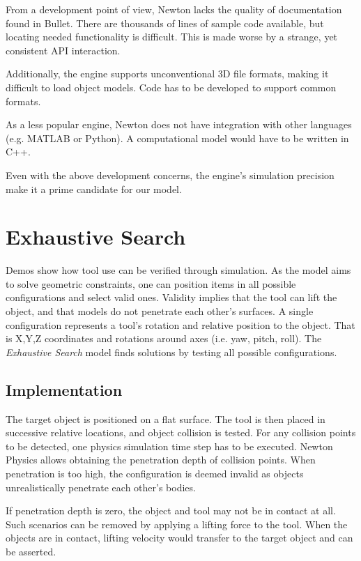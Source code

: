 \documentclass[11]{article}
\begin{document}
From a development point of view, Newton lacks the quality of documentation found in Bullet. 
There are thousands of lines of sample code available, but locating needed functionality is difficult. 
This is made worse by a strange, yet consistent API interaction.

Additionally, the engine supports unconventional 3D file formats, making it difficult to load object models.
Code has to be developed to support common formats.

As a less popular engine, Newton does not have integration with other languages (e.g. MATLAB or Python). 
A computational model would have to be written in C++.

Even with the above development concerns, the engine's simulation precision make it a prime candidate for our model.  

\section{Exhaustive Search}
Demos show how tool use can be verified through simulation.
As the model aims to solve geometric constraints, one can position items in all possible configurations and select valid ones. 
Validity implies that the tool can lift the object, and that models do not penetrate each other's surfaces.
A single configuration represents a tool's rotation and relative position to the object.
That is X,Y,Z coordinates and rotations around axes (i.e. yaw, pitch, roll). 
The \emph{Exhaustive Search} model finds solutions by testing all possible configurations.

\subsection{Implementation}
The target object is positioned on a flat surface. 
The tool is then placed in successive relative locations, and object collision is tested. 
For any collision points to be detected, one physics simulation time step has to be executed.
Newton Physics allows obtaining the penetration depth of collision points. 
When penetration is too high, the configuration is deemed invalid as objects unrealistically penetrate each other's bodies.

If penetration depth is zero, the object and tool may not be in contact at all. 
Such scenarios can be removed by applying a lifting force to the tool.
When the objects are in contact, lifting velocity would transfer to the target object and can be asserted. 
\end{document}
